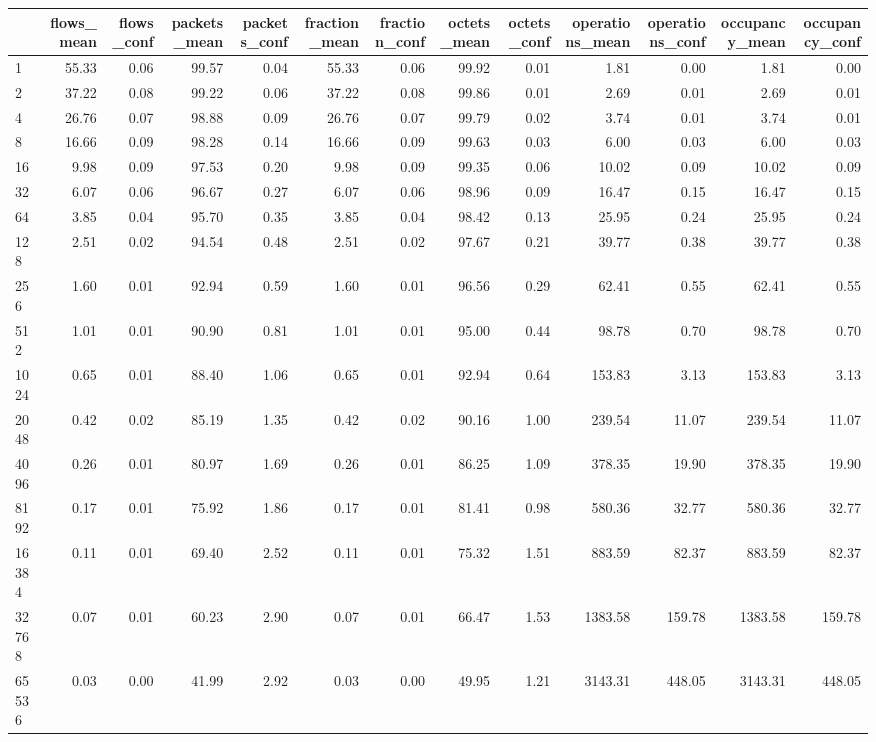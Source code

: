 \begin{tabular}{lrrrrrrrrrrrr}
\toprule
 & flows_mean & flows_conf & packets_mean & packets_conf & fraction_mean & fraction_conf & octets_mean & octets_conf & operations_mean & operations_conf & occupancy_mean & occupancy_conf \\
\midrule
1 & 55.33 & 0.06 & 99.57 & 0.04 & 55.33 & 0.06 & 99.92 & 0.01 & 1.81 & 0.00 & 1.81 & 0.00 \\
2 & 37.22 & 0.08 & 99.22 & 0.06 & 37.22 & 0.08 & 99.86 & 0.01 & 2.69 & 0.01 & 2.69 & 0.01 \\
4 & 26.76 & 0.07 & 98.88 & 0.09 & 26.76 & 0.07 & 99.79 & 0.02 & 3.74 & 0.01 & 3.74 & 0.01 \\
8 & 16.66 & 0.09 & 98.28 & 0.14 & 16.66 & 0.09 & 99.63 & 0.03 & 6.00 & 0.03 & 6.00 & 0.03 \\
16 & 9.98 & 0.09 & 97.53 & 0.20 & 9.98 & 0.09 & 99.35 & 0.06 & 10.02 & 0.09 & 10.02 & 0.09 \\
32 & 6.07 & 0.06 & 96.67 & 0.27 & 6.07 & 0.06 & 98.96 & 0.09 & 16.47 & 0.15 & 16.47 & 0.15 \\
64 & 3.85 & 0.04 & 95.70 & 0.35 & 3.85 & 0.04 & 98.42 & 0.13 & 25.95 & 0.24 & 25.95 & 0.24 \\
128 & 2.51 & 0.02 & 94.54 & 0.48 & 2.51 & 0.02 & 97.67 & 0.21 & 39.77 & 0.38 & 39.77 & 0.38 \\
256 & 1.60 & 0.01 & 92.94 & 0.59 & 1.60 & 0.01 & 96.56 & 0.29 & 62.41 & 0.55 & 62.41 & 0.55 \\
512 & 1.01 & 0.01 & 90.90 & 0.81 & 1.01 & 0.01 & 95.00 & 0.44 & 98.78 & 0.70 & 98.78 & 0.70 \\
1024 & 0.65 & 0.01 & 88.40 & 1.06 & 0.65 & 0.01 & 92.94 & 0.64 & 153.83 & 3.13 & 153.83 & 3.13 \\
2048 & 0.42 & 0.02 & 85.19 & 1.35 & 0.42 & 0.02 & 90.16 & 1.00 & 239.54 & 11.07 & 239.54 & 11.07 \\
4096 & 0.26 & 0.01 & 80.97 & 1.69 & 0.26 & 0.01 & 86.25 & 1.09 & 378.35 & 19.90 & 378.35 & 19.90 \\
8192 & 0.17 & 0.01 & 75.92 & 1.86 & 0.17 & 0.01 & 81.41 & 0.98 & 580.36 & 32.77 & 580.36 & 32.77 \\
16384 & 0.11 & 0.01 & 69.40 & 2.52 & 0.11 & 0.01 & 75.32 & 1.51 & 883.59 & 82.37 & 883.59 & 82.37 \\
32768 & 0.07 & 0.01 & 60.23 & 2.90 & 0.07 & 0.01 & 66.47 & 1.53 & 1383.58 & 159.78 & 1383.58 & 159.78 \\
65536 & 0.03 & 0.00 & 41.99 & 2.92 & 0.03 & 0.00 & 49.95 & 1.21 & 3143.31 & 448.05 & 3143.31 & 448.05 \\

\end{tabular}

